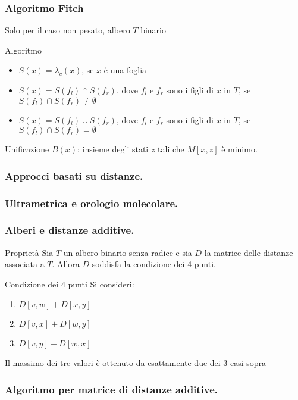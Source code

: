 \begin{frame}[fragile]
\frametitle{Algoritmo Fitch}
Solo per il caso non pesato, albero $T$ binario
\begin{block}{Algoritmo}
\begin{itemize}
\item
$S(x)=\lambda_{c}(x)$, se $x$ è una foglia
\item
$S(x)= S(f_{l}) \cap S(f_{r})$, dove $f_{l}$ e $f_{r}$ sono i figli di $x$ in $T$,
se $S(f_{l}) \cap S(f_{r})\neq \emptyset$
\item
$S(x)= S(f_{l}) \cup S(f_{r})$, dove $f_{l}$ e $f_{r}$ sono i figli di $x$ in $T$,
se $S(f_{l}) \cap S(f_{r}) = \emptyset$
\end{itemize}
\end{block}
\begin{block}{Unificazione}
$B(x)$: insieme degli stati $z$ tali che $M[x,z]$ è minimo.
\end{block}
\end{frame}

\begin{frame}[fragile]
\frametitle{Approcci basati su distanze.}
\end{frame}

\begin{frame}[fragile]
\frametitle{Ultrametrica e orologio molecolare.}
\end{frame}

\begin{frame}[fragile]
\frametitle{Alberi e distanze additive.}
\begin{block}{Proprietà}
Sia $T$ un albero binario senza radice e sia $D$ la matrice delle distanze associata a $T$.
Allora $D$ soddisfa la condizione dei 4 punti.
\end{block}
\begin{block}{Condizione dei 4 punti}
Si consideri:
\begin{enumerate}
\item
$D[v,w] + D[x,y]$
\item
$D[v,x] + D[w,y]$
\item
$D[v,y] + D[w,x]$
\end{enumerate}
Il massimo dei tre valori è ottenuto da esattamente due dei 3 casi sopra
\end{block}
\end{frame}

\begin{frame}[fragile]
\frametitle{Algoritmo per matrice di distanze additive.}
\end{frame}

